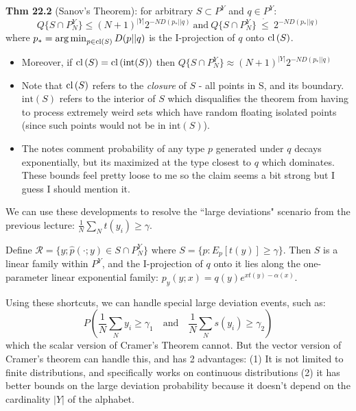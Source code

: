 \documentclass[12pt]{article} %
\begin{document}
\textbf{Thm 22.2} (Sanov's Theorem): for arbitrary $S \subset P^Y$ and $q \in P^Y$:
\begin{equation*}
    Q\{
    S \cap P_N^Y
    \}
    \leq 
    (N+1)^{|Y|}
    2^{-ND(p_* || q)}
    \ \text{and} \
    Q\{
    S \cap P_N^Y
    \}\ 
    \dot{\leq}\
    2^{-ND(p_* || q)}
\end{equation*}
where $p_* = \operatorname*{arg\,min}_{p \in \text{cl}(S)} D(p||q)$ is the I-projection of $q$ onto $\text{cl}\left( S \right)$. 
\begin{itemize}[topsep=-1pt, itemsep=-1pt]
    \item 
Moreover, if $\text{cl}\left( S \right) = \text{cl}\left( \text{int}(S) \right)$ then $ Q\{S \cap P_N^Y\} \approx (N+1)^{|Y|} 2^{-ND(p_* || q)}$
    \item Note that $\text{cl}\left( S \right)$ refers to the \textit{closure} of $S$ - all points in S, and its boundary. $\text{int}(S)$ refers to the interior of $S$ which disqualifies the theorem from having to process extremely weird sets which have random floating isolated points (since such points would not be in $\text{int}(S)$).
    \item 
The notes comment probability of any type $p$ generated under $q$ decays exponentially, but its maximized at the type closest to $q$ which dominates. These bounds feel pretty loose to me so the claim seems a bit strong but I guess I should mention it.
\end{itemize}

\separate

We can use these developments to resolve the ``large deviations" scenario from the previous lecture: $\frac{1}{N} \sum_N t(y_i) \geq \gamma$.

Define $\mathcal{R} = \{y; \hat{p}(\cdot;y) \in S \cap P_N^Y\}$ where $S = \{p: E_p[t(y)] \geq \gamma\}$. Then $S$ is a linear family within $P^Y$, and the I-projection of $q$ onto it lies along the one-parameter linear exponential family: $p_y(y;x) = q(y) e^{xt(y) - \alpha(x)}$.

Using these shortcuts, we can handle special large deviation events, such as:
\begin{equation*}
    P\left(
    \frac{1}{N} \sum_N y_i \geq \gamma_1 
    \quad \text{and} \quad
    \frac{1}{N} \sum_N s(y_i) \geq \gamma_2
    \right)
\end{equation*}
which the scalar version of Cramer's Theorem cannot. But the vector version of Cramer's theorem can handle this, and has 2 advantages: (1) It is not limited to finite distributions, and specifically works on continuous distributions (2) it has better bounds on the large deviation probability because it doesn't depend on the cardinality $|Y|$ of the alphabet. 
\end{document}
